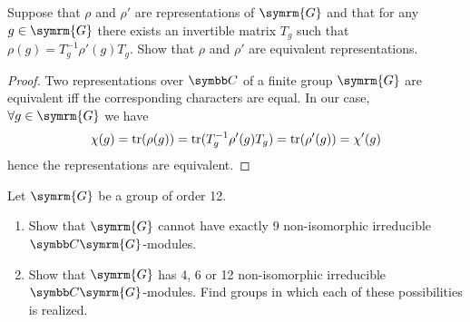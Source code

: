 \begin{exercise}
Suppose that \(\rho\) and \(\rho'\) are representations of \(\symrm{G}\) and that for any \(g \in \symrm{G}\) there exists an invertible matrix \(T_g\) such that \(\rho(g) = T_g^{-1} \rho'(g) T_g\). Show that \(\rho\) and \(\rho'\) are equivalent representations.
\end{exercise}
\begin{proof}
Two representations over \(\complex\) of a finite group \(\symrm{G}\) are equivalent iff the corresponding characters are equal. In our case, \(\forall g \in \symrm{G}\) we have
\[
    \chi(g) = \operatorname*{tr}(\rho(g)) = \operatorname*{tr}(T_g^{-1} \rho'(g) T_g) = \operatorname*{tr}(\rho'(g)) = \chi'(g)
\]
hence the representations are equivalent.
\end{proof}

\begin{exercise}
Let \(\symrm{G}\) be a group of order 12.
\begin{enumerate}
    \item Show that \(\symrm{G}\) cannot have exactly 9 non-isomorphic irreducible \(\complex \symrm{G}\)-modules.

    \item Show that \(\symrm{G}\) has 4, 6 or 12 non-isomorphic irreducible \(\complex \symrm{G}\)-modules. Find groups in which each of these possibilities is realized.
\end{enumerate}
\end{exercise}
